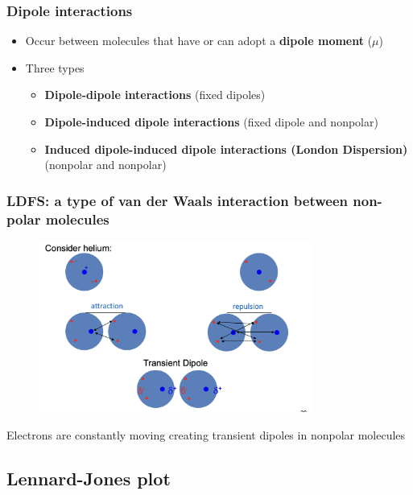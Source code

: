 \documentclass[letterpaper, 12pt]{article}
\begin{document}
\subsubsection*{Dipole interactions}

\begin{itemize}
\item Occur between molecules that have or can adopt a \textbf{dipole moment} ($\mu$)
\item Three types
\begin{itemize}
\item \textbf{Dipole-dipole interactions} (fixed dipoles)
\item \textbf{Dipole-induced dipole interactions} (fixed dipole and nonpolar)
\item \textbf{Induced dipole-induced dipole interactions (London Dispersion)} (nonpolar and nonpolar)
\end{itemize}
\end{itemize}

\subsubsection*{LDFS: a type of van der Waals interaction between non-polar molecules}

\begin{figure}[H]
\centering
\includegraphics[width=0.8\textwidth]{ldfs}
\end{figure}

Electrons are constantly moving creating transient dipoles in nonpolar molecules

\subsection*{Lennard-Jones plot}
\end{document}
